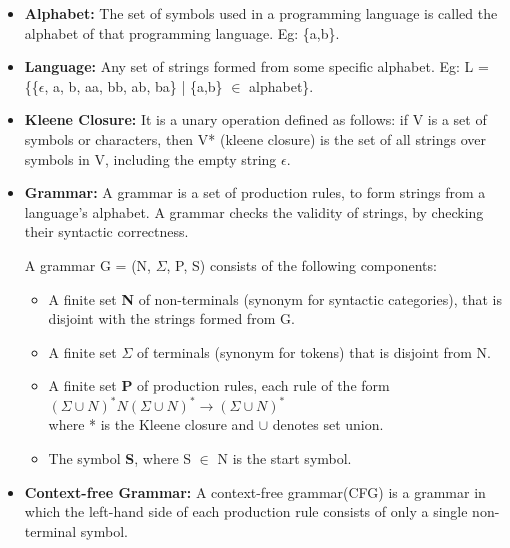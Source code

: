 \begin{itemize} %
\item \textbf{Alphabet:} The set of symbols used in a programming language is called the alphabet of that programming language. Eg: \{a,b\}.
\item \textbf{Language:} Any set of strings formed from some specific alphabet. Eg: L = \{\{$\epsilon$, a, b, aa, bb, ab, ba\} | \{a,b\} $\in$ alphabet\}.
\item \textbf{Kleene Closure:} It is a unary operation defined as follows: if V is a set of symbols or characters, then V* (kleene closure) is the set of all strings over symbols in V, including the empty string $\epsilon$.
\item \textbf{Grammar:} A grammar is a set of production rules, to form strings from a language's alphabet. A grammar checks the validity of strings, by checking their syntactic correctness.

A grammar G = (N, $\Sigma$, P, S) consists of the following components:
\begin{itemize}
\item A finite set \textbf{N} of non-terminals (synonym for syntactic categories), that is disjoint with the strings formed from G.
\item A finite set \textbf{$\Sigma$} of terminals (synonym for tokens) that is disjoint from N.
\item A finite set \textbf{P} of production rules, each rule of the form \\
 $(\Sigma \cup N)^{*} N (\Sigma \cup N)^{*} \rightarrow (\Sigma \cup N)^{*}$ \\
where * is the Kleene closure and $\cup$ denotes set union.
\item The symbol \textbf{S}, where S $\in$ N is the start symbol.
\end{itemize}


\item \textbf{Context-free Grammar:} A context-free grammar(CFG) is a grammar in which the left-hand side of each production rule consists of only a single non-terminal symbol.


\end{itemize}
